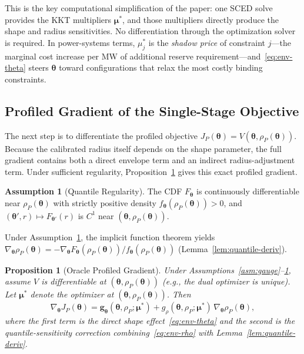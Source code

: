 \documentclass[11pt]{article}
\newcommand{\btheta}{\bm{\theta}}
\newcommand{\bmu}{\bm{\mu}}
\newcommand{\bg}{\bm{g}}
\newtheorem{proposition}[theorem]{Proposition}
\theoremstyle{definition}
\newtheorem{assumption}{Assumption}
\begin{document}
This is the key computational simplification of the paper: one SCED solve provides the KKT multipliers $\bmu^*$, and those multipliers directly produce the shape and radius sensitivities. No differentiation through the optimization solver is required. In power-systems terms, $\mu_j^*$ is the \emph{shadow price} of constraint $j$---the marginal cost increase per MW of additional reserve requirement---and~\eqref{eq:env-theta} steers $\btheta$ toward configurations that relax the most costly binding constraints.

\subsection{Profiled Gradient of the Single-Stage Objective}

The next step is to differentiate the profiled objective $J_P(\btheta)=V(\btheta,\rho_P(\btheta))$. Because the calibrated radius itself depends on the shape parameter, the full gradient contains both a direct envelope term and an indirect radius-adjustment term. Under sufficient regularity, Proposition~\ref{thm:true-oracle-grad} gives this exact profiled gradient.

\begin{assumption}[Quantile Regularity]\label{asm:quantile-reg}
The CDF $F_{\btheta}$ is continuously differentiable near $\rho_P(\btheta)$ with strictly positive density $f_{\btheta}(\rho_P(\btheta)) > 0$, and $(\btheta',r) \mapsto F_{\btheta'}(r)$ is $C^1$ near $(\btheta, \rho_P(\btheta))$.
\end{assumption}

Under Assumption~\ref{asm:quantile-reg}, the implicit function theorem yields $\nabla_{\btheta} \rho_P(\btheta) = -\nabla_{\btheta} F_{\btheta}(\rho_P(\btheta)) / f_{\btheta}(\rho_P(\btheta))$ (Lemma~\ref{lem:quantile-deriv}).

\begin{proposition}[Oracle Profiled Gradient]\label{thm:true-oracle-grad}
Under Assumptions~\ref{asm:gauge}--\ref{asm:quantile-reg}, assume $V$ is differentiable at $(\btheta,\rho_P(\btheta))$ (e.g., the dual optimizer is unique). Let $\bmu^*$ denote the optimizer at $(\btheta,\rho_P(\btheta))$. Then
\begin{equation}\label{eq:true-grad-expanded}
\nabla_{\btheta}J_P(\btheta)=\bg_{\btheta}(\btheta,\rho_P;\bmu^*)+g_\rho(\btheta,\rho_P;\bmu^*)\,\nabla_{\btheta}\rho_P(\btheta),
\end{equation}
where the first term is the direct shape effect~\eqref{eq:env-theta} and the second is the quantile-sensitivity correction combining~\eqref{eq:env-rho} with Lemma~\ref{lem:quantile-deriv}.
\end{proposition}
\end{document}
